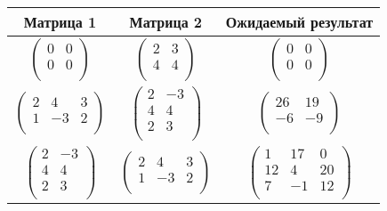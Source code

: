 \begin{table}[h]
    \centering
    \begin{tabular}{|c|c|c|}
        \hline
        \bfseries Матрица 1  & \bfseries Матрица 2 & \bfseries Ожидаемый результат
        \\\hline
        $\begin{pmatrix} 0 & 0 \\ 0 & 0 \\ \end{pmatrix}$
        &
        $\begin{pmatrix} 2 & 3 \\ 4 & 4 \\ \end{pmatrix}$
        &
        $\begin{pmatrix} 0 & 0 \\ 0 & 0 \\ \end{pmatrix}$
        \\\hline

        $\begin{pmatrix} 2 & 4 & 3 \\ 1 & -3 & 2 \\ \end{pmatrix}$
        &
        $\begin{pmatrix} 2 & -3 \\ 4 & 4 \\ 2 & 3\\ \end{pmatrix}$
        &
        $\begin{pmatrix} 26 & 19 \\ -6 & -9 \\ \end{pmatrix}$
        \\\hline

        $\begin{pmatrix} 2 & -3 \\ 4 & 4 \\ 2 & 3\\ \end{pmatrix}$
        &
        $\begin{pmatrix} 2 & 4 & 3 \\ 1 & -3 & 2 \\ \end{pmatrix}$
        &
        $\begin{pmatrix} 1 & 17 & 0 \\ 12 & 4 & 20 \\ 7 & -1 & 12 \\ \end{pmatrix}$
        \\\hline


\end{tabular}
\end{table}
